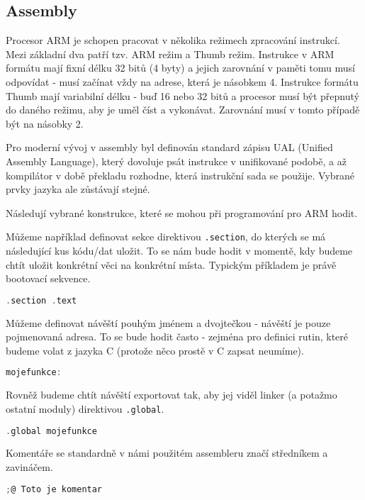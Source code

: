 \documentclass{article}
\begin{document}
\subsection{Assembly}

Procesor ARM je schopen pracovat v několika režimech zpracování instrukcí. Mezi základní dva patří tzv. ARM režim a Thumb režim. Instrukce v ARM formátu mají fixní délku 32 bitů (4 byty) a jejich zarovnání v paměti tomu musí odpovídat - musí začínat vždy na adrese, která je násobkem 4. Instrukce formátu Thumb mají variabilní délku - buď 16 nebo 32 bitů a procesor musí být přepnutý do daného režimu, aby je uměl číst a vykonávat. Zarovnání musí v tomto případě být na násobky 2.

Pro moderní vývoj v assembly byl definován standard zápisu UAL (Unified Assembly Language), který dovoluje psát instrukce v unifikované podobě, a až kompilátor v době překladu rozhodne, která instrukční sada se použije. Vybrané prvky jazyka ale zůstávají stejné.

Následují vybrané konstrukce, které se mohou při programování pro ARM hodit.

Můžeme například definovat sekce direktivou \texttt{.section}, do kterých se má následující kus kódu/dat uložit. To se nám bude hodit v momentě, kdy budeme chtít uložit konkrétní věci na konkrétní místa. Typickým příkladem je právě bootovací sekvence.

\begin{lstlisting}[language=C]
.section .text
\end{lstlisting}

Můžeme definovat návěští pouhým jménem a dvojtečkou - návěští je pouze pojmenovaná adresa. To se bude hodit často - zejména pro definici rutin, které budeme volat z jazyka C (protože něco prostě v C zapsat neumíme).

\begin{lstlisting}[language=C]
mojefunkce:
\end{lstlisting}

Rovněž budeme chtít návěští exportovat tak, aby jej viděl linker (a potažmo ostatní moduly) direktivou \texttt{.global}.

\begin{lstlisting}[language=C]
.global mojefunkce
\end{lstlisting}

Komentáře se standardně v námi použitém assembleru značí středníkem a zavináčem.

\begin{lstlisting}[language=C]
;@ Toto je komentar
\end{lstlisting}
\end{document}
